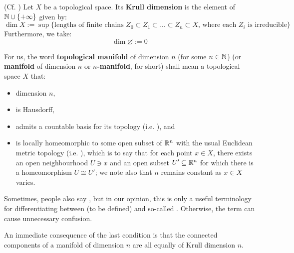         \begin{definition} \label{def: krull_dimension}
            (Cf. \cite[\href{https://stacks.math.columbia.edu/tag/0055}{Tag 0055}]{stacks}) Let $X$ be a topological space. Its \textbf{Krull dimension} is the element of $\mathbb{N} \cup \{+\infty\}$ given by:
                $$\dim X := \sup \{ \text{lengths of finite chains $Z_0 \subset Z_1 \subset ... \subset Z_n \subset X$, where each $Z_i$ is irreducible} \}$$
            Furthermore, we take:
                $$\dim \varnothing := 0$$
        \end{definition}
        \begin{definition} \label{def: topological_manifolds}
            For us, the word \textbf{topological manifold} of dimension $n$ (for some $n \in \mathbb{N}$) (or \textbf{manifold} of dimension $n$ or \textbf{$n$-manifold}, for short) shall mean a topological space $X$ that:
            \begin{itemize}
                \item dimension $n$,
                \item is Hausdorff,
                \item admits a countable basis for its topology (i.e. ), and
                \item is locally homeomorphic to some open subset of $\mathbb{R}^n$ with the usual Euclidean metric topology (i.e. ), which is to say that for each point $x \in X$, there exists an open neighbourhood $U \ni x$ and an open subset $U' \subseteq \mathbb{R}^n$ for which there is a homeomorphism $U \cong U'$; we note also that $n$ remains constant as $x \in X$ varies.
            \end{itemize}
            
            Sometimes, people also say , but in our opinion, this is only a useful terminology for differentiating between  (to be defined) and so-called . Otherwise, the term can cause unnecessary confusion.
        \end{definition}
        \begin{remark}
            An immediate consequence of the last condition is that the connected components of a manifold of dimension $n$ are all equally of Krull dimension $n$.
        \end{remark}
        
